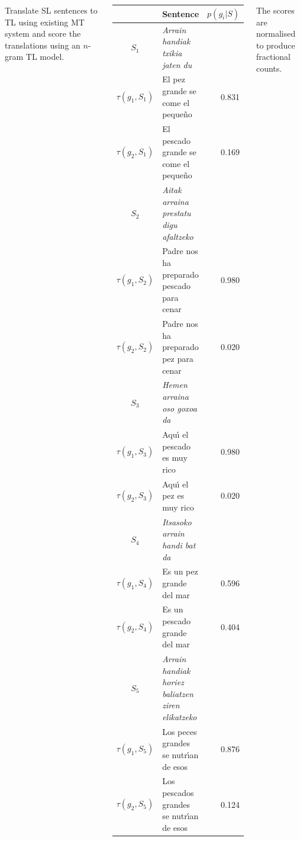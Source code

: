 \documentclass[25pt, a0paper, portrait, margin=0mm, innermargin=15mm,blockverticalspace=15mm, colspace=15mm, subcolspace=8mm]{tikzposter}
\begin{document}
\begin{columns}
{Translate SL sentences to TL using existing MT system and score the translations using an $n$-gram TL model.
~\\
\begin{center}
\begin{tabular}{|c|l|r|}
     \hline
        & \textbf{Sentence} & $p(g_i|S)$ \\
     \hline %
      \(S_1\) & \emph{Arrain handiak txikia jaten du}  &  \\
                         $\tau(g_{1},S_1)$ & El pez grande se come el peque\~{n}o &  0.831 \\
                         $\tau(g_{2},S_1)$ & El pescado grande se come el peque\~{n}o & 0.169 \\
     \hline %
      \(S_2\) & \emph{Aitak arraina prestatu digu afaltzeko} &  \\
                         $\tau(g_{1},S_2)$ & Padre nos ha preparado pescado para cenar & 0.980 \\
                         $\tau(g_{2},S_2)$ & Padre nos ha preparado pez para cenar & 0.020 \\
     \hline %
     $S_3$  & \emph{Hemen arraina oso goxoa da}  & \\
                         $\tau(g_{1},S_3)$ & Aqu\'{\i} el pescado es muy rico & 0.980 \\
                         $\tau(g_{2},S_3)$ & Aqu\'{\i} el pez es muy rico & 0.020 \\
     \hline %
     \(S_4\) & \emph{Itsasoko arrain handi bat da} & \\
                         $\tau(g_{1},S_4)$ & Es un pez grande del mar & 0.596 \\
                         $\tau(g_{2},S_4)$ & Es un pescado grande del mar & 0.404 \\
     \hline %
     $S_5$ &  \emph{Arrain handiak horiez baliatzen ziren elikatzeko} &  \\
                         $\tau(g_{1},S_5)$ & Los peces grandes se nutr\'{\i}an de esos & 0.876 \\
                         $\tau(g_{2},S_5)$ & Los pescados grandes se nutr\'{\i}an de esos & 0.124 \\
     \hline
   \end{tabular}
\end{center}
The scores are normalised to produce fractional counts.
}


\end{columns}
\end{document}
